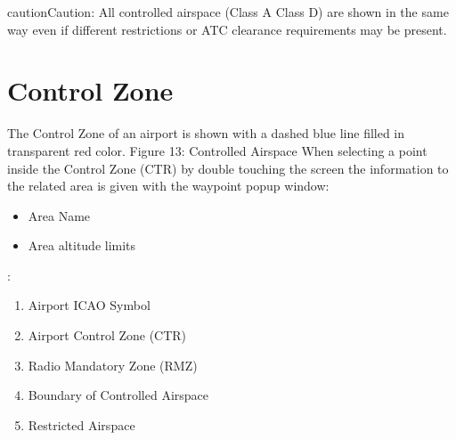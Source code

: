 \documentclass[letterpaper,10pt,english]{sphinxmanual}
\begin{document}
\begin{sphinxadmonition}{caution}{Caution:}
\sphinxAtStartPar
All controlled airspace (Class A \textendash{} Class D) are shown in the same way even if different restrictions or ATC clearance requirements may be present.
\end{sphinxadmonition}


\section{Control Zone}
\label{\detokenize{03-reference/airspace_display:control-zone}}
\sphinxAtStartPar
The Control Zone of an airport is shown with a dashed blue line filled in transparent red color. Figure 13:  Controlled Airspace
When selecting a point inside the Control Zone (CTR) by double touching the screen the information to the related area is given with the waypoint pop\sphinxhyphen{}up window:
\begin{itemize}
\item {} 
\sphinxAtStartPar
Area Name

\item {} 
\sphinxAtStartPar
Area altitude limits

\end{itemize}

\begin{figure}[htbp]
\centering

\noindent{}
\end{figure}

\sphinxAtStartPar
{}:
\begin{enumerate}
%
\item {} 
\sphinxAtStartPar
Airport ICAO Symbol

\item {} 
\sphinxAtStartPar
Airport Control Zone (CTR)

\item {} 
\sphinxAtStartPar
Radio Mandatory Zone (RMZ)

\item {} 
\sphinxAtStartPar
Boundary of Controlled Airspace

\item {} 
\sphinxAtStartPar
Restricted Airspace

\end{enumerate}
\end{document}
